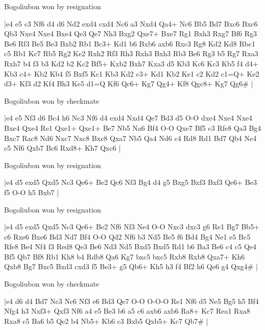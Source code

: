 \showboard

Bogoliubon won by resignation

\makegametitle
|e4 e5 c3 Nf6 d4 d6 Nd2 exd4 cxd4 Nc6 a3 Nxd4 Qa4+ Nc6 Bb5 Bd7 Bxc6 Bxc6 Qb3 Nxe4 Nxe4 Bxe4 Qe3 Qe7 Nh3 Bxg2 Qxe7+ Bxe7 Rg1 Bxh3 Rxg7 Bf6 Rg3 Be6 Rf3 Be5 Be3 Bxb2 Rb1 Bc3+ Kd1 b6 Bxb6 axb6 Rxc3 Rg8 Kd2 Kd8 Rbc1 c5 Rb1 Kc7 Rb5 Rg2 Ke2 Rxh2 Rf3 Rh3 Rxh3 Bxh3 Rb3 Be6 Rg3 b5 Rg7 Rxa3 Rxh7 b4 f3 b3 Kd2 b2 Kc2 Bf5+ Kxb2 Bxh7 Kxa3 d5 Kb3 Kc6 Kc3 Kb5 f4 d4+ Kb3 c4+ Kb2 Kb4 f5 Bxf5 Kc1 Kb3 Kd2 c3+ Kd1 Kb2 Ke1 c2 Kd2 c1=Q+ Ke2 d3+ Kf3 d2 Kf4 Bh3 Ke5 d1=Q Kf6 Qc6+ Kg7 Qg4+ Kf8 Qgc8+ Kg7 Qg6\#  |

\showboard

Bogoliubon won by checkmate

\makegametitle
|e4 e5 Nf3 d6 Bc4 h6 Nc3 Nf6 d4 exd4 Nxd4 Qe7 Bd3 d5 O-O dxe4 Nxe4 Nxe4 Bxe4 Qxe4 Re1 Qxe1+ Qxe1+ Be7 Nb5 Na6 Bf4 O-O Qxe7 Bf5 c3 Rfe8 Qa3 Bg4 Bxc7 Rac8 Nd6 Nxc7 Nxc8 Bxc8 Qxa7 Nb5 Qa4 Nd6 c4 Rd8 Rd1 Bd7 Qb4 Ne4 c5 Nf6 Qxb7 Bc6 Rxd8+ Kh7 Qxc6  |

\showboard

Bogoliubon won by resignation

\makegametitle
|e4 d5 exd5 Qxd5 Nc3 Qe6+ Be2 Qc6 Nf3 Bg4 d4 g5 Bxg5 Bxf3 Bxf3 Qe6+ Be3 f5 O-O h5 Bxb7  |

\showboard

Bogoliubon won by resignation

\makegametitle
|e4 d5 exd5 Qxd5 Nc3 Qe6+ Be2 Nf6 Nf3 Ne4 O-O Nxc3 dxc3 g6 Re1 Bg7 Bb5+ c6 Rxe6 Bxe6 Bd3 Nd7 Bf4 O-O Qd2 Nf6 b3 Nd5 Be5 f6 Bd4 Bg4 Ne1 e5 Bc5 Rfe8 Be4 Nf4 f3 Red8 Qe3 Be6 Nd3 Nd5 Bxd5 Bxd5 Rd1 b6 Ba3 Be6 c4 c5 Qe4 Bf5 Qb7 Bf8 Rb1 Kh8 b4 Rdb8 Qa6 Kg7 bxc5 bxc5 Rxb8 Rxb8 Qxa7+ Kh6 Qxb8 Bg7 Bxc5 Bxd3 cxd3 f5 Be3+ g5 Qb6+ Kh5 h3 f4 Bf2 h6 Qe6 g4 Qxg4\#  |

\showboard

Bogoliubon won by checkmate

\makegametitle
|e4 d6 d4 Bd7 Nc3 Nc6 Nf3 e6 Bd3 Qe7 O-O O-O-O Re1 Nf6 d5 Ne5 Bg5 h5 Bf4 Nfg4 h3 Nxf3+ Qxf3 Nf6 a4 e5 Be3 b6 a5 c6 axb6 axb6 Ra8+ Kc7 Rea1 Rxa8 Rxa8 c5 Ba6 b5 Qe2 b4 Nb5+ Kb6 c3 Bxb5 Qxb5+ Kc7 Qb7\#  |

